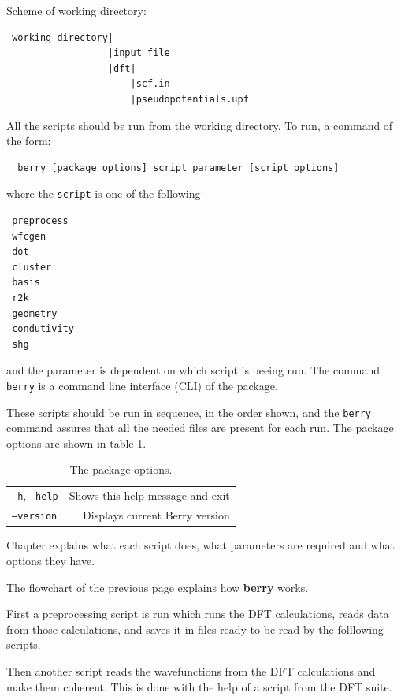 \documentclass[a4paper,12pt]{report}
\begin{document}
 \newpage
Scheme of working directory:
\begin{verbatim}
 working_directory|
                  |input_file
                  |dft|
                      |scf.in
                      |pseudopotentials.upf
\end{verbatim}
\bigskip

 All the scripts should be run from the working directory.
 To run, a command of the form:
 \begin{verbatim}
  berry [package options] script parameter [script options]
 \end{verbatim}
where the \texttt{script} is one of the following
\begin{verbatim}
 preprocess
 wfcgen
 dot
 cluster
 basis
 r2k
 geometry
 condutivity
 shg
\end{verbatim}
and the parameter is dependent on which script is beeing run.
The command \texttt{berry} is a command line interface (CLI) of the package.

These scripts should be run in sequence, in the order shown, and the \texttt{berry} command assures
that all the needed files are present for each run.
The package options are shown in table \ref{tab:package_options}.

\begin{table}[h]
 \centering
 \caption{The package options.}\label{tab:package_options}
\begin{tabular}[]{lr}
\hline
  \texttt{-h}, \texttt{--help}     &    Shows this help message and exit \\
  \texttt{--version}               &    Displays current Berry version \\
\hline
\end{tabular}
\bigskip
\end{table}

Chapter  explains what each script does,
what parameters are required and what options they have.



The flowchart of the previous page explains how \textbf{berry} works.

First a preprocessing script is run which runs the DFT calculations, reads data from those
calculations, and saves it in files ready to be read by the folllowing scripts.

Then another script reads the wavefunctions from the DFT calculations and make them coherent.
This is done with the help of a script from the DFT suite.
\end{document}
